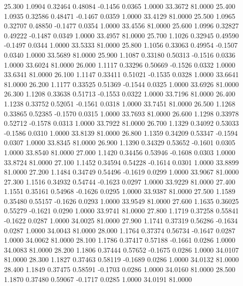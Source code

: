   25.300   1.0904   0.32464   0.48084  -0.1456   0.0365   1.0000  33.3672  81.0000
  25.400   1.0935   0.32586   0.48471  -0.1467   0.0359   1.0000  33.4129  81.0000
  25.500   1.0965   0.32707   0.48850  -0.1477   0.0354   1.0000  33.4556  81.0000
  25.600   1.0996   0.32827   0.49222  -0.1487   0.0349   1.0000  33.4957  81.0000
  25.700   1.1026   0.32945   0.49590  -0.1497   0.0344   1.0000  33.5333  81.0000
  25.800   1.1056   0.33063   0.49954  -0.1507   0.0340   1.0000  33.5689  81.0000
  25.900   1.1087   0.33180   0.50313  -0.1516   0.0336   1.0000  33.6024  81.0000
  26.000   1.1117   0.33296   0.50669  -0.1526   0.0332   1.0000  33.6341  81.0000
  26.100   1.1147   0.33411   0.51021  -0.1535   0.0328   1.0000  33.6641  81.0000
  26.200   1.1177   0.33525   0.51369  -0.1544   0.0325   1.0000  33.6926  81.0000
  26.300   1.1208   0.33638   0.51713  -0.1553   0.0322   1.0000  33.7196  81.0000
  26.400   1.1238   0.33752   0.52051  -0.1561   0.0318   1.0000  33.7451  81.0000
  26.500   1.1268   0.33865   0.52385  -0.1570   0.0315   1.0000  33.7693  81.0000
  26.600   1.1298   0.33978   0.52712  -0.1578   0.0313   1.0000  33.7922  81.0000
  26.700   1.1329   0.34092   0.53033  -0.1586   0.0310   1.0000  33.8139  81.0000
  26.800   1.1359   0.34209   0.53347  -0.1594   0.0307   1.0000  33.8345  81.0000
  26.900   1.1390   0.34329   0.53652  -0.1601   0.0305   1.0000  33.8540  81.0000
  27.000   1.1420   0.34456   0.53946  -0.1608   0.0303   1.0000  33.8724  81.0000
  27.100   1.1452   0.34594   0.54228  -0.1614   0.0301   1.0000  33.8899  81.0000
  27.200   1.1484   0.34749   0.54496  -0.1619   0.0299   1.0000  33.9067  81.0000
  27.300   1.1516   0.34932   0.54744  -0.1623   0.0297   1.0000  33.9229  81.0000
  27.400   1.1551   0.35161   0.54968  -0.1626   0.0295   1.0000  33.9387  81.0000
  27.500   1.1589   0.35480   0.55157  -0.1626   0.0293   1.0000  33.9549  81.0000
  27.600   1.1635   0.36025   0.55279  -0.1621   0.0290   1.0000  33.9741  81.0000
  27.800   1.1719   0.37258   0.55841  -0.1622   0.0287   1.0000  34.0025  81.0000
  27.900   1.1741   0.37319   0.56286  -0.1634   0.0287   1.0000  34.0043  81.0000
  28.000   1.1764   0.37374   0.56734  -0.1647   0.0287   1.0000  34.0062  81.0000
  28.100   1.1786   0.37417   0.57188  -0.1661   0.0286   1.0000  34.0083  81.0000
  28.200   1.1806   0.37444   0.57652  -0.1675   0.0286   1.0000  34.0107  81.0000
  28.300   1.1827   0.37463   0.58119  -0.1689   0.0286   1.0000  34.0132  81.0000
  28.400   1.1849   0.37475   0.58591  -0.1703   0.0286   1.0000  34.0160  81.0000
  28.500   1.1870   0.37480   0.59067  -0.1717   0.0285   1.0000  34.0191  81.0000
